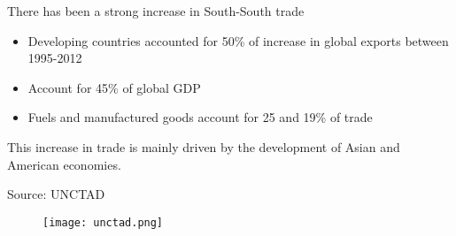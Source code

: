 \documentclass{beamer}
\begin{document}
\begin{frame}
  There has been a strong increase in South-South trade
  \begin{itemize}
    \item Developing countries accounted for 50\% of increase in global exports between 1995-2012
    \item Account for 45\% of global GDP
    \item Fuels and manufactured goods account for 25 and 19\% of trade
  \end{itemize}
  \medskip
  This increase in trade is mainly driven by the development of Asian and American economies.
\end{frame}

\begin{frame}{Source: UNCTAD}
  \begin{figure}
    \texttt{[image: unctad.png]}
  \end{figure}
\end{frame}

\end{document}

